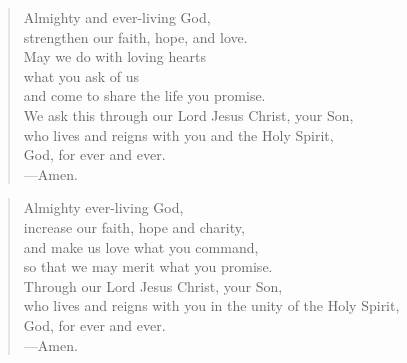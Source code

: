\prayer

\setlength{\leftmargini}{\prayerleftmargini}

\begin{verse}
Almighty and ever-living God,\\
strengthen our faith, hope, and love.\\
May we do with loving hearts\\
what you ask of us\\
and come to share the life you promise.\\
We ask this through our Lord Jesus Christ, your Son,\\
who lives and reigns with you and the Holy Spirit,\\
God, for ever and ever.\\
{\color{red}---\thinspace}Amen.
\end{verse}


\begin{verse}
Almighty ever-living God,\\
increase our faith, hope and charity,\\
and make us love what you command,\\
so that we may merit what you promise.\\
Through our Lord Jesus Christ, your Son,\\
who lives and reigns with you in the unity of the Holy Spirit,\\
God, for ever and ever.\\
{\color{red}---\thinspace}Amen.
\end{verse}

\setlength{\leftmargini}{\defleftmargini}